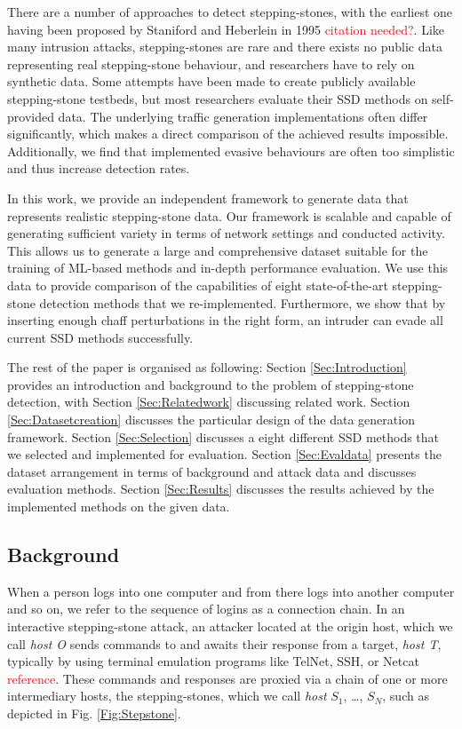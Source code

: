 \documentclass[runningheads]{llncs}\usepackage[]{graphicx}\usepackage[]{color}
\begin{document}
There are a number of approaches to detect stepping-stones, with the earliest one having been proposed by Staniford and Heberlein in 1995 \textcolor{red}{citation needed?}. Like many intrusion attacks, stepping-stones are rare and there exists no public data representing real stepping-stone behaviour, and researchers have to rely on synthetic data. Some attempts have been made to create publicly available stepping-stone testbeds, but most researchers evaluate their SSD methods on self-provided data. The underlying traffic generation implementations often differ significantly, which makes a direct comparison of the achieved results impossible. Additionally, we find that implemented evasive behaviours are often too simplistic and thus increase detection rates. 

In this work, we provide an independent framework to generate data that represents realistic stepping-stone data. Our framework is scalable and capable of generating sufficient variety in terms of network settings and conducted activity. This allows us to generate a large and comprehensive dataset suitable for the training of ML-based methods and in-depth performance evaluation. We use this data to provide comparison of the capabilities of eight state-of-the-art stepping-stone detection methods that we re-implemented. Furthermore, we show that by inserting enough chaff perturbations in the right form, an intruder can evade all current SSD methods successfully.

The rest of the paper is organised as following: Section \ref{Sec:Introduction} provides an introduction and background to the problem of stepping-stone detection, with Section \ref{Sec:Relatedwork} discussing related work. Section \ref{Sec:Datasetcreation} discusses the particular design of the data generation framework. Section \ref{Sec:Selection} discusses a eight different SSD methods that we selected and implemented for evaluation. Section \ref{Sec:Evaldata} presents the dataset arrangement in terms of background and attack data and discusses evaluation methods. Section \ref{Sec:Results} discusses the results achieved by the implemented methods on the given data. 

\subsection{Background}

When a person logs into one computer and from there logs into another computer and so on, we refer to the sequence of logins as a connection chain. In an interactive stepping-stone attack, an attacker located at the origin host, which we call \textit{host O} sends commands to and awaits their response from a target, \textit{host T}, typically by using terminal emulation programs like TelNet, SSH, or Netcat  \textcolor{red}{reference}. These commands and responses are proxied via a chain of one or more intermediary hosts, the stepping-stones, which we call \textit{host} $S_1$, \dots, $S_N$, such as depicted in Fig. \ref{Fig:Stepstone}. 
\end{document}
